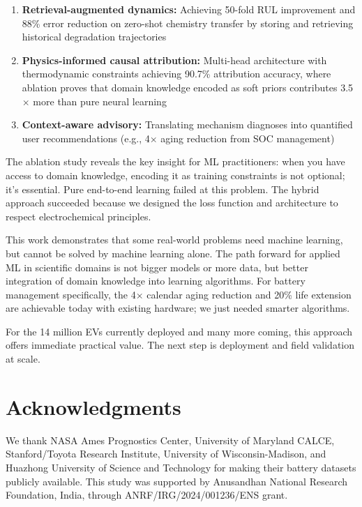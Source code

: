 \documentclass[5p,times,authoryear]{elsarticle}
\begin{document}
\begin{enumerate}
    \item \textbf{Retrieval-augmented dynamics:} Achieving 50-fold RUL improvement and 88\% error reduction on zero-shot chemistry transfer by storing and retrieving historical degradation trajectories
    \item \textbf{Physics-informed causal attribution:} Multi-head architecture with thermodynamic constraints achieving 90.7\% attribution accuracy, where ablation proves that domain knowledge encoded as soft priors contributes 3.5$\times$ more than pure neural learning
    \item \textbf{Context-aware advisory:} Translating mechanism diagnoses into quantified user recommendations (e.g., 4$\times$ aging reduction from SOC management)
\end{enumerate}

The ablation study reveals the key insight for ML practitioners: when you have access to domain knowledge, encoding it as training constraints is not optional; it's essential. Pure end-to-end learning failed at this problem. The hybrid approach succeeded because we designed the loss function and architecture to respect electrochemical principles.

This work demonstrates that some real-world problems need machine learning, but cannot be solved by machine learning alone. The path forward for applied ML in scientific domains is not bigger models or more data, but better integration of domain knowledge into learning algorithms. For battery management specifically, the 4$\times$ calendar aging reduction and 20\% life extension are achievable today with existing hardware; we just needed smarter algorithms.

For the 14 million EVs currently deployed and many more coming, this approach offers immediate practical value. The next step is deployment and field validation at scale.

\section*{Acknowledgments}

We thank NASA Ames Prognostics Center, University of Maryland CALCE, Stanford/Toyota Research Institute, University of Wisconsin-Madison, and Huazhong University of Science and Technology for making their battery datasets publicly available. This study was supported by Anusandhan National Research Foundation, India, through ANRF/IRG/2024/001236/ENS grant.


\end{document}

